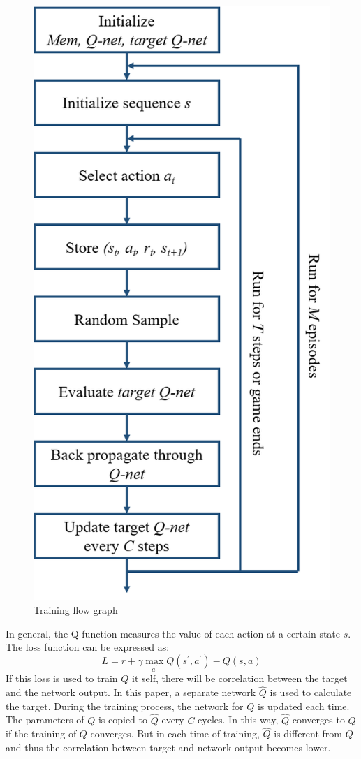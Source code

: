 \documentclass[10pt,twocolumn,letterpaper]{article}
\begin{document}
\begin{CJK}{UTF8}{gbsn}
\begin{figure}
\begin{center}
   \includegraphics[width=0.9\linewidth]{flow.png}
\end{center}
\caption{Training flow graph}
\label{fig:flow}
\end{figure}

In general, the Q function measures the value of each action at a certain state $s$. The loss function can be expressed as:
\[
    L = r+\gamma \max\limits_{a^\prime} Q(s^\prime, a^\prime) - Q(s, a)
\]
If this loss is used to train $Q$ it self, there will be correlation between the target and the network output. In this paper, a separate network $\hat{Q}$ is used to calculate the target. During the training process, the network for $Q$ is updated each time. The parameters of $Q$ is copied to $\hat{Q}$ every $C$ cycles. In this way, $\hat{Q}$ converges to $Q$ if the training of $Q$ converges. But in each time of training, $\hat{Q}$ is different from $Q$ and thus the correlation between target and network output becomes lower.


\end{CJK}
\end{document}
